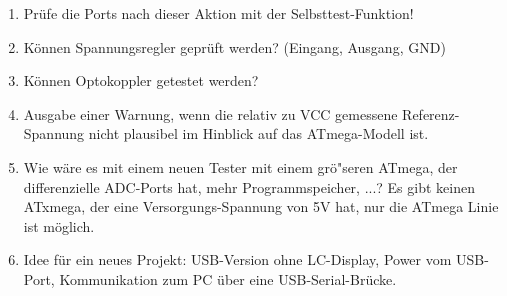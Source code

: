 \begin{enumerate}
\item Pr\"ufe die Ports nach dieser Aktion mit der Selbsttest-Funktion!
\item K\"onnen Spannungsregler gepr\"uft werden? (Eingang, Ausgang, GND)
\item K\"onnen Optokoppler getestet werden?
\item Ausgabe einer Warnung, wenn die relativ zu VCC gemessene Referenz-Spannung nicht plausibel im Hinblick auf das ATmega-Modell ist.
\item Wie w\"are es mit einem neuen Tester mit einem gr\"o"seren ATmega, der differenzielle ADC-Ports hat,
mehr Programmspeicher, ...?
Es gibt keinen ATxmega, der eine Versorgungs-Spannung von 5V hat, nur die ATmega Linie ist m\"oglich.
\item Idee f\"ur ein neues Projekt: USB-Version ohne LC-Display, Power vom USB-Port, Kommunikation zum PC \"uber eine USB-Serial-Br\"ucke.
\end{enumerate}
